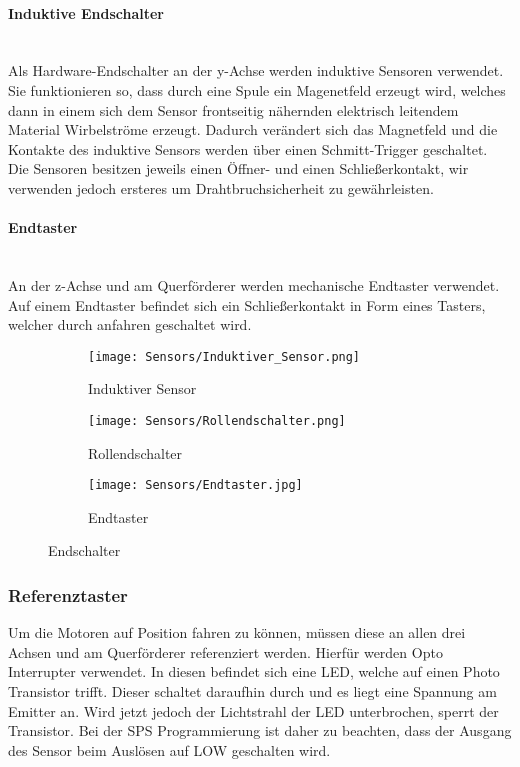 \paragraph{Induktive Endschalter} \mbox{}\\
Als Hardware-Endschalter an der y-Achse werden induktive Sensoren verwendet. Sie funktionieren so, dass durch eine Spule ein Magenetfeld erzeugt wird, welches dann in einem sich dem Sensor frontseitig nähernden elektrisch leitendem Material Wirbelströme erzeugt. Dadurch verändert sich das Magnetfeld und die Kontakte des induktive Sensors werden über einen Schmitt-Trigger geschaltet. Die Sensoren besitzen jeweils einen Öffner- und einen Schließerkontakt, wir verwenden jedoch ersteres um Drahtbruchsicherheit zu gewährleisten.

\paragraph{Endtaster} \mbox{}\\
An der z-Achse und am Querförderer werden mechanische Endtaster verwendet. Auf einem Endtaster befindet sich ein Schließerkontakt in Form eines Tasters, welcher durch anfahren geschaltet wird.

\begin{figure}[H]
    \centering
    \begin{subfigure}{.3\textwidth}
        \centering
        \texttt{[image: Sensors/Induktiver\_Sensor.png]}
        \caption{Induktiver Sensor \cite{induktiv_sensor}}
        \label{ulr:dorn}
    \end{subfigure}%
    \begin{subfigure}{.3\textwidth}
        \centering
        \texttt{[image: Sensors/Rollendschalter.png]}
        \caption{Rollendschalter \cite{schmersal_pic}}
        \label{ulr:f1}
    \end{subfigure}%
    \begin{subfigure}{.3\textwidth}
        \centering
        \texttt{[image: Sensors/Endtaster.jpg]}
        \caption{Endtaster}
        \label{ulr:f2}
    \end{subfigure}
    \caption{Endschalter}
    \label{ulr}
\end{figure}

\subsubsection{Referenztaster}
Um die Motoren auf Position fahren zu können, müssen diese an allen drei Achsen und am Querförderer referenziert werden. Hierfür werden Opto Interrupter verwendet. In diesen befindet sich eine LED, welche auf einen Photo Transistor trifft. Dieser schaltet daraufhin durch und es liegt eine Spannung am Emitter an. Wird jetzt jedoch der Lichtstrahl der LED unterbrochen, sperrt der Transistor. Bei der SPS Programmierung ist daher zu beachten, dass der Ausgang des Sensor beim Auslösen auf LOW geschalten wird.\\

